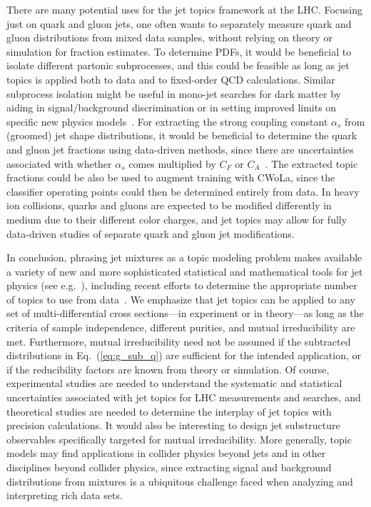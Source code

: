 \documentclass[aps,prl,floatfix,preprintnumbers,twocolumn,groupedaddress,nofootinbib,longbibliography]{revtex4-1}
\DeclareRobustCommand{\Eq}[1]{Eq.~(\ref{#1})}
\begin{document}
There are many potential uses for the jet topics framework at the LHC.
%
Focusing just on quark and gluon jets, one often wants to separately measure quark and gluon distributions from mixed data samples, without relying on theory or simulation for fraction estimates.
%
To determine PDFs, it would be beneficial to isolate different partonic subprocesses, and this could be feasible as long as jet topics is applied both to data and to fixed-order QCD calculations.
%
Similar subprocess isolation might be useful in mono-jet searches for dark matter by aiding in signal/background discrimination or in setting improved limits on specific new physics models~\cite{Aaboud:2017phn,Sirunyan:2017jix}.
%
For extracting the strong coupling constant $\alpha_s$ from (groomed) jet shape distributions, it would be beneficial to determine the quark and gluon jet fractions using data-driven methods, since there are uncertainties associated with whether $\alpha_s$ comes multiplied by $C_F$ or $C_A$~\cite{Bendavid:2018nar}.
%
The extracted topic fractions could be also be used to augment training with CWoLa, since the classifier operating points could then be determined entirely from data.
%
In heavy ion collisions, quarks and gluons are expected to be modified differently in medium due to their different color charges, and jet topics may allow for fully data-driven studies of separate quark and gluon jet modifications.

In conclusion, phrasing jet mixtures as a topic modeling problem makes available a variety of new and more sophisticated statistical and mathematical tools for jet physics (see e.g.~\cite{blei2003latent,lee1999learning,donoho2004does,arora2012learning,naik2011overview,blanchard2014decontamination,jain2016nonparametric,katz2016mutual,katz2017decontamination,comon2010handbook,reju2009algorithm,sanderson2014class,scott2015rate,ramaswamy2016mixture,ding2015necessary,ding2015learning,arora2013practical,katz2017decontamination}), including recent efforts to determine the appropriate number of topics to use from data~\cite{greene2014many,wang2014topic,zhao2015heuristic}.
%
We emphasize that jet topics can be applied to any set of multi-differential cross sections---in experiment or in theory---as long as the criteria of sample independence, different purities, and mutual irreducibility are met.
%
Furthermore, mutual irreducibility need not be assumed if the subtracted distributions in \Eq{eq:g_sub_q} are sufficient for the intended application, or if the reducibility factors are known from theory or simulation.
%
Of course, experimental studies are needed to understand the systematic and statistical uncertainties associated with jet topics for LHC measurements and searches, and theoretical studies are needed to determine the interplay of jet topics with precision calculations.
%
It would also be interesting to design jet substructure observables specifically targeted for mutual irreducibility.
%
More generally, topic models may find applications in collider physics beyond jets and in other disciplines beyond collider physics, since extracting signal and background distributions from mixtures is a ubiquitous challenge faced when analyzing and interpreting rich data sets.
\end{document}
